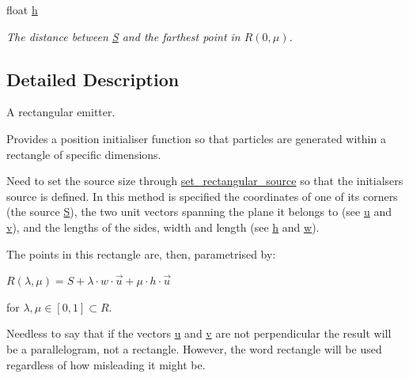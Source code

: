 \begin{DoxyCompactItemize}
\mbox{\label{classphysim_1_1emitters_1_1free__emitters_1_1rect__source_aebabbc2dc4e697b10d37e54d998f1146}} 
float \hyperlink{classphysim_1_1emitters_1_1free__emitters_1_1rect__source_aebabbc2dc4e697b10d37e54d998f1146}{h}
\begin{DoxyCompactList}\small\item\em The distance between \hyperlink{classphysim_1_1emitters_1_1free__emitters_1_1rect__source_a0d958945449e9d31e95b154f942b21ca}{S} and the farthest point in $R(0,\mu)$. \end{DoxyCompactList}\end{DoxyCompactItemize}


\subsection{Detailed Description}
A rectangular emitter. 

Provides a position initialiser function so that particles are generated within a rectangle of specific dimensions.

Need to set the source size through \hyperlink{classphysim_1_1emitters_1_1free__emitters_1_1rect__source_ab85134622163dfc1e3a77730ea94557e}{set\+\_\+rectangular\+\_\+source} so that the initialser\textquotesingle{}s source is defined. In this method is specified the coordinates of one of its corners (the source \hyperlink{classphysim_1_1emitters_1_1free__emitters_1_1rect__source_a0d958945449e9d31e95b154f942b21ca}{S}), the two unit vectors spanning the plane it belongs to (see \hyperlink{classphysim_1_1emitters_1_1free__emitters_1_1rect__source_a692e4b1fd9e74b5c7692cad3f0c184c4}{u} and \hyperlink{classphysim_1_1emitters_1_1free__emitters_1_1rect__source_a9540156884818d3f6b0ed86a1b0902d0}{v}), and the lengths of the sides, width and length (see \hyperlink{classphysim_1_1emitters_1_1free__emitters_1_1rect__source_aebabbc2dc4e697b10d37e54d998f1146}{h} and \hyperlink{classphysim_1_1emitters_1_1free__emitters_1_1rect__source_ab6e88219088b1048622242f7f2d03f91}{w}).

The points in this rectangle are, then, parametrised by\+:

$R(\lambda, \mu) = S + \lambda\cdot w\cdot \vec{u} + \mu\cdot h\cdot \vec{u}$

for $\lambda,\mu \in [0,1]\subset R$.

Needless to say that if the vectors \hyperlink{classphysim_1_1emitters_1_1free__emitters_1_1rect__source_a692e4b1fd9e74b5c7692cad3f0c184c4}{u} and \hyperlink{classphysim_1_1emitters_1_1free__emitters_1_1rect__source_a9540156884818d3f6b0ed86a1b0902d0}{v} are not perpendicular the result will be a parallelogram, not a rectangle. However, the word \textquotesingle{}rectangle\textquotesingle{} will be used regardless of how misleading it might be. 


